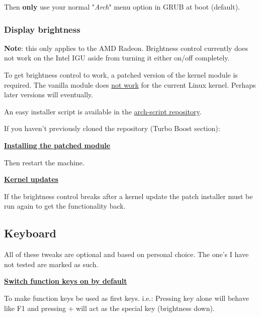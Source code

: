 Then \textbf{only} use your normal "\textit{Arch}" menu option in GRUB at boot (default).

\subsubsection{Display brightness}

\textbf{Note}: this only applies to the AMD Radeon. Brightness control currently does not work on the Intel IGU aside from turning it either on/off completely.

To get brightness control to work, a patched version of the  kernel module is required. The vanilla module does \href{https://bugzilla.kernel.org/show_bug.cgi?id=105051#c37}{not work} for the current Linux kernel. Perhaps later versions will eventually.

An easy installer script is available in the \href{https://github.com/An7ar35/arch-scripts}{arch-script repository}.

If you haven't previously cloned the repository (Turbo Boost section):


\vspace*{1em}
\textbf{\textcolor{textgrey}{\uline{Installing the patched module}}}


Then restart the machine.

\vspace*{1em}
\textbf{\textcolor{textgrey}{\uline{Kernel updates}}}

If the brightness control breaks after a kernel update the patch installer must be run again to get the functionality back.

\subsection{Keyboard}

All of these tweaks are optional and based on personal choice. The one's I have not tested are marked as such.

\vspace*{1em}
\textbf{\textcolor{textgrey}{\uline{Switch function keys on by default}}}

To make function keys be used as first keys. i.e.: Pressing  key alone will behave like F1 and pressing + will act as the special key (brightness down).

